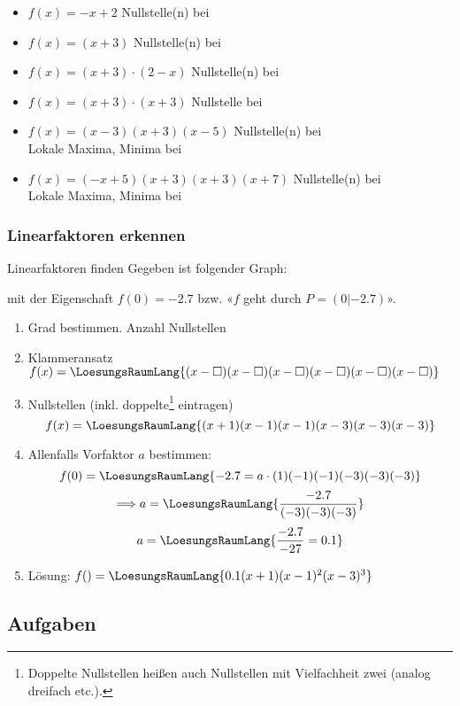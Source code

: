 \begin{itemize}
\item $f(x) = -x + 2 $ Nullstelle(n) bei  
\item $f(x) = (x+3)$ Nullstelle(n) bei 
\item $f(x) = (x+3)\cdot{}(2-x)$ Nullstelle(n) bei
\item $f(x) = (x+3)\cdot{}(x+3)$ 
  Nullstelle bei 
\item $f(x) = (x-3)(x+3)(x-5)$ Nullstelle(n) bei \\
  Lokale Maxima, Minima bei 
\item $f(x) = (-x+5)(x+3)(x+3)(x+7)$ Nullstelle(n) bei
  \\
  Lokale Maxima, Minima bei 
\end{itemize}
\newpage


\subsubsection{Linearfaktoren erkennen}

\begin{rezept}{Linearfaktoren finden}{}
Gegeben ist folgender Graph:

  mit der Eigenschaft $f(0) = -2.7$ bzw. «$f$ geht durch $P=(0|-2.7)$».
    
    \begin{enumerate}
  \item Grad bestimmen. Anzahl Nullstellen
     
  \item Klammeransatz $f(x) =
    \LoesungsRaumLang{(x-\Box)(x-\Box)(x-\Box)(x-\Box)(x-\Box)(x-\Box)}$
  \item Nullstellen (inkl. doppelte\footnote{Doppelte Nullstellen heißen auch
      Nullstellen mit Vielfachheit zwei (analog
      dreifach etc.).} eintragen)
    $$f(x) = \LoesungsRaumLang{(x+1)(x-1)(x-1)(x-3)(x-3)(x-3)}$$
  \item Allenfalls Vorfaktor $a$ bestimmen:
    $$f(0) = \LoesungsRaumLang{-2.7 = a \cdot{}(1)(-1)(-1)(-3)(-3)(-3)}$$
    $$\Longrightarrow a= \LoesungsRaumLang{\frac{-2.7}{(-3)(-3)(-3)}}$$
    $$a  = \LoesungsRaumLang{\frac{-2.7}{-27} = 0.1}$$

  \item Lösung: $f() = \LoesungsRaumLang{0.1 (x+1)(x-1)^2(x-3)^3}$ 
    \end{enumerate}
  
  \end{rezept}
\newpage


\subsection*{Aufgaben}

\TNTeop{}%


\newpage

